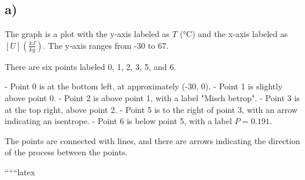 

\subsection*{a)}

The graph is a plot with the y-axis labeled as \( T \) (°C) and the x-axis labeled as \( [U] \left( \frac{kJ}{kg} \right) \). The y-axis ranges from -30 to 67. 

There are six points labeled 0, 1, 2, 3, 5, and 6. 

- Point 0 is at the bottom left, at approximately (-30, 0).
- Point 1 is slightly above point 0.
- Point 2 is above point 1, with a label "Misch betrop".
- Point 3 is at the top right, above point 2.
- Point 5 is to the right of point 3, with an arrow indicating an isentrope.
- Point 6 is below point 5, with a label \( P = 0.191 \).

The points are connected with lines, and there are arrows indicating the direction of the process between the points.

``````latex